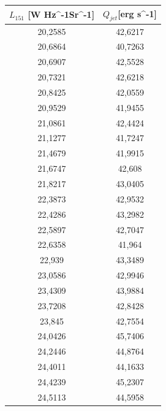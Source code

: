 \documentclass[11pt,
               a4paper,
               parskip=half, style=authoryear, citestyle=authoryear-comp
              bibliography=totoc,
               ]{scrartcl}
\begin{document}
\begin{table}[h]
            \centering
             \begin{tabular}{|c|c|}
               $L_{151}$ [W Hz^{-1}Sr^{-1}] & $Q_{jet} $[erg s^{-1}] \\
               \hline
              20,2585& 42,6217  \\
              \hline
              20,6864& 40,7263  \\
              \hline
              20,6907& 42,5528  \\ 
              \hline
              20,7321& 42,6218  \\
              \hline
              20,8425& 42,0559  \\
              \hline
              20,9529& 41,9455  \\
              \hline
              21,0861& 42,4424  \\
              \hline
              21,1277& 41,7247  \\
              \hline
              21,4679& 41,9915  \\
              \hline
              21,6747& 42,608  \\ 
              \hline
              21,8217& 43,0405\\
              \hline
              22,3873& 42,9532 \\
              \hline
              22,4286& 43,2982 \\
              \hline
              22,5897& 42,7047 \\
              \hline
              22,6358& 41,964\\
              \hline
              22,939& 43,3489 \\
              \hline
              23,0586& 42,9946 \\
              \hline
              23,4309& 43,9884\\
              \hline
              23,7208& 42,8428 \\
              \hline
              23,845& 42,7554\\
              \hline
              24,0426& 45,7406\\
              \hline
              24,2446& 44,8764\\
              \hline
              24,4011 & 44,1633\\
              \hline
              24,4239 & 45,2307\\
              \hline
              24,5113 & 44,5958\\

\end{tabular}
\end{table}
\end{document}

